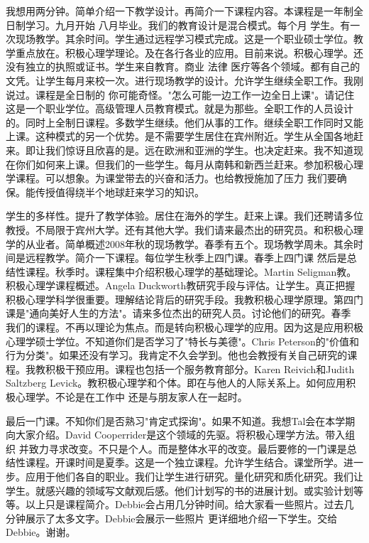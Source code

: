 我想用两分钟。简单介绍一下教学设计。再简介一下课程内容。本课程是一年制全日制学习。九月开始 八月毕业。我们的教育设计是混合模式。每个月 学生。有一次现场教学。其余时间。学生通过远程学习模式完成。这是一个职业硕士学位。教学重点放在。积极心理学理论。及在各行各业的应用。目前来说。积极心理学。还没有独立的执照或证书。学生来自教育。商业 法律 医疗等各个领域。都有自己的文凭。让学生每月来校一次。进行现场教学的设计。允许学生继续全职工作。我刚说过。课程是全日制的 你可能奇怪。"怎么可能一边工作一边全日上课"。请记住这是一个职业学位。高级管理人员教育模式。就是为那些。全职工作的人员设计的。同时上全制日课程。多数学生继续。他们从事的工作。继续全职工作同时又能上课。这种模式的另一个优势。是不需要学生居住在宾州附近。学生从全国各地赶来。即让我们惊讶且欣喜的是。远在欧洲和亚洲的学生。也决定赶来。我不知道现在你们如何来上课。但我们的一些学生。每月从南韩和新西兰赶来。参加积极心理学课程。可以想象。为课堂带去的兴奋和活力。也给教授施加了压力 我们要确保。能传授值得绕半个地球赶来学习的知识。 

学生的多样性。提升了教学体验。居住在海外的学生。赶来上课。我们还聘请多位教授。不局限于宾州大学。还有其他大学。我们请来最杰出的研究员。和积极心理学的从业者。简单概述2008年秋的现场教学。春季有五个。现场教学周未。其余时间是远程教学。简介一下课程。每位学生秋季上四门课。春季上四门课 然后是总结性课程。秋季时。课程集中介绍积极心理学的基础理论。Martin Seligman教。积极心理学课程概述。Angela Duckworth教研究手段与评估。让学生。真正把握积极心理学科学很重要。理解结论背后的研究手段。我教积极心理学原理。第四门课是"通向美好人生的方法"。请来多位杰出的研究人员。讨论他们的研究。春季 我们的课程。不再以理论为焦点。而是转向积极心理学的应用。因为这是应用积极心理学硕士学位。不知道你们是否学习了"特长与美德"。Chris Peterson的"价值和行为分类"。如果还没有学习。我肯定不久会学到。他也会教授有关自己研究的课程。我教积极干预应用。课程也包括一个服务教育部分。Karen Reivich和Judith Saltzberg Levick。教积极心理学和个体。即在与他人的人际关系上。如何应用积极心理学。不论是在工作中 还是与朋友家人在一起时。 

最后一门课。不知你们是否熟习"肯定式探询"。如果不知道。我想Tal会在本学期向大家介绍。David Cooperrider是这个领域的先驱。将积极心理学方法。带入组织 并致力寻求改变。不只是个人。而是整体水平的改变。最后要修的一门课是总结性课程。开课时间是夏季。这是一个独立课程。允许学生结合。课堂所学。进一步。应用于他们各自的职业。我们让学生进行研究。量化研究和质化研究。我们让学生。就感兴趣的领域写文献观后感。他们计划写的书的进展计划。或实验计划等等。以上只是课程简介。Debbie会占用几分钟时间。给大家看一些照片。过去几分钟展示了太多文字。Debbie会展示一些照片 更详细地介绍一下学生。交给Debbie。谢谢。 

